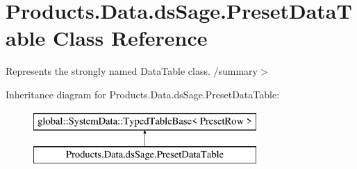\hypertarget{class_products_1_1_data_1_1ds_sage_1_1_preset_data_table}{}\section{Products.\+Data.\+ds\+Sage.\+Preset\+Data\+Table Class Reference}
\label{class_products_1_1_data_1_1ds_sage_1_1_preset_data_table}


Represents the strongly named Data\+Table class. /summary$>$  


Inheritance diagram for Products.\+Data.\+ds\+Sage.\+Preset\+Data\+Table\+:\begin{figure}[H]
\begin{center}
\leavevmode
\includegraphics[height=2.000000cm]{class_products_1_1_data_1_1ds_sage_1_1_preset_data_table}
\end{center}
\end{figure}
